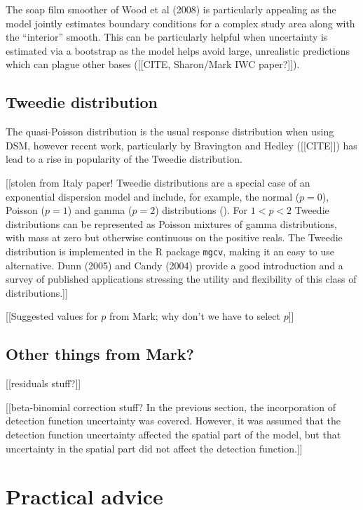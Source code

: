 \documentclass[useAMS,referee]{biom}
\begin{document}
The soap film smoother of Wood et al (2008) is particularly appealing as the model jointly estimates boundary conditions for a complex study area along with the ``interior'' smooth. This can be particularly helpful when uncertainty is estimated via a bootstrap as the model helps avoid large, unrealistic predictions which can plague other bases ([[CITE, Sharon/Mark IWC paper?]]).

\subsection{Tweedie distribution}
\label{s:Tweedie}

The quasi-Poisson distribution is the usual response distribution when using DSM, however recent work, particularly by Bravington and Hedley ([[CITE]]) has lead to a rise in popularity of the Tweedie distribution. 


[[stolen from Italy paper! 
Tweedie distributions are a special case of an exponential dispersion model and include, for example, the normal ($p=0$), Poisson ($p=1$) and gamma ($p=2$) distributions (\cite{Jorgensen}). For $1<p<2$ Tweedie distributions can be represented as Poisson mixtures of gamma distributions, with mass at zero but otherwise continuous on the positive reals. The Tweedie distribution is implemented in the \textsf{R} package \texttt{mgcv}, making it an easy to use alternative. Dunn (2005) and Candy (2004) provide a good introduction and a survey of published applications stressing the utility and flexibility of this class of distributions.]]


[[Suggested values for $p$ from Mark; why don't we have to select $p$]]

\subsection{Other things from Mark?}

[[residuals stuff?]]

[[beta-binomial correction stuff?
In the previous section, the incorporation of detection function uncertainty was covered. However, it was assumed that the detection function uncertainty affected the spatial part of the model, but that uncertainty in the spatial part did not affect the detection function.]]


\section{Practical advice}
\label{s:practical}
\end{document}
